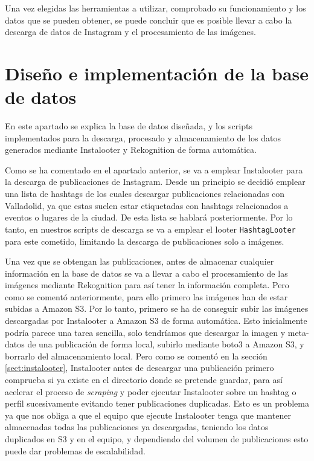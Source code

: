 Una vez elegidas las herramientas a utilizar, comprobado su funcionamiento y los datos que se pueden obtener, se puede concluir que es posible llevar a cabo la descarga de datos de Instagram y el procesamiento de las imágenes.

\section{Diseño e implementación de la base de datos}

En este apartado se explica la base de datos diseñada, y los scripts implementados para la descarga, procesado y almacenamiento de los datos generados mediante Instalooter y Rekognition de forma automática.

Como se ha comentado en el apartado anterior, se va a emplear Instalooter para la descarga de publicaciones de Instagram. Desde un principio se decidió emplear una lista de hashtags de los cuales descargar publicaciones relacionadas con Valladolid, ya que estas suelen estar etiquetadas con hashtags relacionados a eventos o lugares de la ciudad. De esta lista se hablará posteriormente. Por lo tanto, en nuestros scripts de descarga se va a emplear el looter \texttt{HashtagLooter} para este cometido, limitando la descarga de publicaciones solo a imágenes.

Una vez que se obtengan las publicaciones, antes de almacenar cualquier información en la base de datos se va a llevar a cabo el procesamiento de las imágenes mediante Rekognition para así tener la información completa. Pero como se comentó anteriormente, para ello primero las imágenes han de estar subidas a Amazon S3. Por lo tanto, primero se ha de conseguir subir las imágenes descargadas por Instalooter a Amazon S3 de forma automática. Esto inicialmente podría parece una tarea sencilla, solo tendríamos que descargar la imagen y meta-datos de una publicación de forma local, subirlo mediante boto3 a Amazon S3, y borrarlo del almacenamiento local. Pero como se comentó en la sección \ref{sect:instalooter}, Instalooter antes de descargar una publicación primero comprueba si ya existe en el directorio donde se pretende guardar, para así acelerar el proceso de \textit{scraping} y poder ejecutar Instalooter sobre un hashtag o perfil sucesivamente evitando tener publicaciones duplicadas. Esto es un problema ya que nos obliga a que el equipo que ejecute Instalooter tenga que mantener almacenadas todas las publicaciones ya descargadas, teniendo los datos duplicados en S3 y en el equipo, y dependiendo del volumen de publicaciones esto puede dar problemas de escalabilidad.

